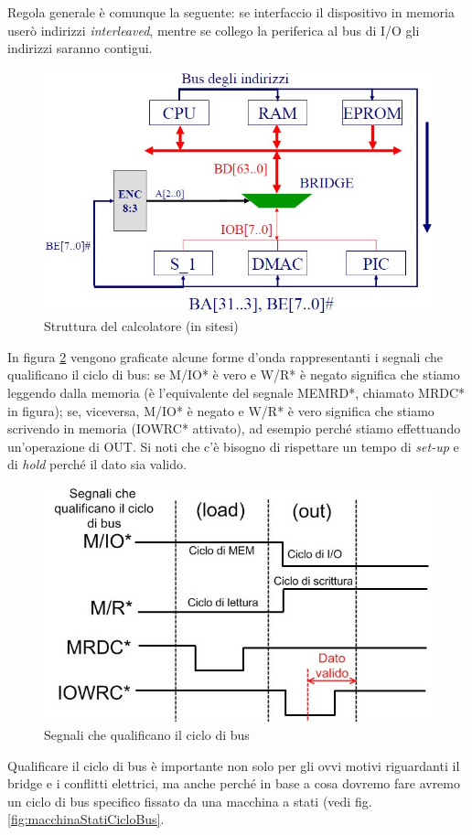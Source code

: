 Regola generale è comunque la seguente: se interfaccio il dispositivo in memoria userò indirizzi \textit{interleaved}, mentre se collego la periferica al bus di I/O gli indirizzi saranno contigui.

\begin{figure}[!h]
\centering
\includegraphics[width=0.75\columnwidth]{img/schemaSolito}
\caption{Struttura del calcolatore (in sitesi)}
\label{fig:schemaSolito}
\end{figure}

In figura \ref{fig:ciclivari} vengono graficate alcune forme d'onda rappresentanti i segnali che qualificano il ciclo di bus: se M/IO* è vero e W/R* è negato significa che stiamo leggendo dalla memoria (è l'equivalente del segnale MEMRD*, chiamato MRDC* in figura); se, viceversa, M/IO* è negato e W/R* è vero significa che stiamo scrivendo in memoria (IOWRC* attivato), ad esempio perché stiamo effettuando un'operazione di OUT. Si noti che c'è bisogno di rispettare un tempo di \textit{set-up} e di \textit{hold} perché il dato sia valido. 

\begin{figure}[!h]
\centering
\includegraphics[width=0.6\columnwidth]{img/ciclivari}
\caption{Segnali che qualificano il ciclo di bus}
\label{fig:ciclivari}
\end{figure}

Qualificare il ciclo di bus è importante non solo per gli ovvi motivi riguardanti il bridge e i conflitti elettrici, ma anche perché in base a cosa dovremo fare avremo un ciclo di bus specifico fissato da una macchina a stati (vedi fig. \ref{fig:macchinaStatiCicloBus}.

